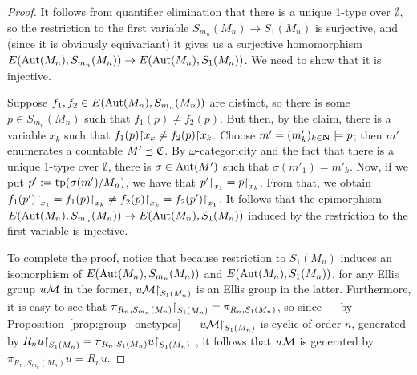 \begin{proof}
		It follows from quantifier elimination that there is a unique 1-type over $\emptyset$, so the restriction to the first variable $S_{m_n}(M_n)\to S_1(M_n)$ is surjective, and (since it is obviously equivariant) it gives us a surjective homomorphism $E(\operatorname{{Aut}}(M_n),S_{m_n}(M_n))\to E(\operatorname{{Aut}}(M_n),S_1(M_n))$. We need to show that it is injective.
		
		Suppose $f_1,f_2\in E(\operatorname{{Aut}}(M_n),S_{m_n}(M_n))$ are distinct, so there is some $p\in S_{m_n}(M_n)$ such that $f_1(p)\neq f_2(p)$. But then, by the claim, there is a variable $x_k$ such that $f_1(p)\mathord{\upharpoonright} x_k\neq f_2(p)\mathord{\upharpoonright} x_k$. Choose $m'=(m'_k)_{k\in {\mathbf{N}}}\models p$; then $m'$ enumerates a countable $M'\preceq {\mathfrak C}$. By $\omega$-categoricity and the fact that there is a unique 1-type over $\emptyset$, there is $\sigma\in \operatorname{{Aut}}(M')$ such that $\sigma(m'_1)=m'_k$. Now, if we put $p':=\operatorname{{tp}}(\sigma(m')/M_n)$, we have that $p'\mathord{\upharpoonright}_{x_1}=p\mathord{\upharpoonright}_{x_k}$. From that, we obtain $f_1(p')\mathord{\upharpoonright}_{x_1}=f_1(p)\mathord{\upharpoonright}_{x_k}\neq f_2(p)\mathord{\upharpoonright}_{x_k}=f_2(p')\mathord{\upharpoonright}_{x_1}$. It follows that the epimorphism $E(\operatorname{{Aut}}(M_n),S_{m_n}(M_n))\to E(\operatorname{{Aut}}(M_n),S_1(M_n))$ induced by the restriction to the first variable is injective.
		
		To complete the proof, notice that because restriction to $S_1(M_n)$ induces an isomorphism of $E(\operatorname{{Aut}}(M_n),S_{m_n}(M_n))$ and $E(\operatorname{{Aut}}(M_n),S_1(M_n))$, for any Ellis group $u{\mathcal M}$ in the former, $u{\mathcal M}\mathord{\upharpoonright}_{S_1(M_n)}$ is an Ellis group in the latter. Furthermore, it is easy to see that $\pi_{R_n,S_{m_n}(M_n)}\mathord{\upharpoonright}_{S_1(M_n)}=\pi_{R_n,S_{1}(M_n)}$, so since --- by Proposition~\ref{prop:group_onetypes} --- $u{\mathcal M}\mathord{\upharpoonright}_{S_1(M_n)}$ is cyclic of order $n$, generated by $R_nu\mathord{\upharpoonright}_{S_1(M_n)}=\pi_{R_n,S_{1}(M_n)}u\mathord{\upharpoonright}_{S_1(M_n)}$ , it follows that $u{\mathcal M}$ is generated by $\pi_{R_n,S_{m_n}(M_n)}u=R_nu$.
	\end{proof}
	
